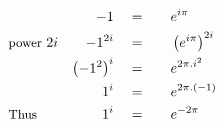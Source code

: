 \begin{alignat*}{5}
&\,&-1\quad&=\quad&&e^{i\pi}\\
&\small\text{power }2i&-1^{2i}\normalsize\quad&=&&\left(e^{i\pi}\right)^{2i}\\
&\,&\left(-1^2\right)^i\quad&=&&e^{2\pi.i^2}\\
&\,&1^i\quad&=&&e^{2\pi.(-1)}\\
&\small\text{Thus}&1^i\quad&=&&e^{-2\pi}
\end{alignat*}
